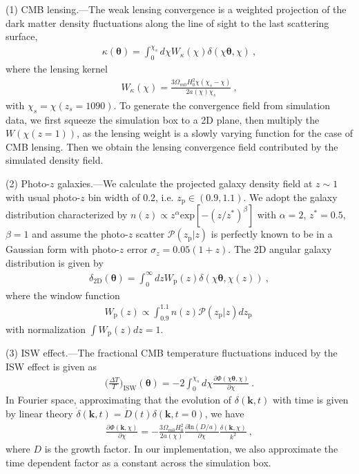 \documentclass[aps,prl,twocolumn,showpacs,superscriptaddress,groupedaddress,nofootinbib,floatfix]{revtex4}  %
\newcommand{\mr}{\mathrm}
\begin{document}
(1) CMB lensing.---The weak lensing convergence is a weighted projection
of the dark matter density fluctuations along the line of sight to the last 
scattering surface,
\begin{eqnarray}
\kappa(\bm{\theta})=\int_0^{\chi_s}d\chi 
W_\kappa(\chi)\delta(\chi\bm{\theta},\chi)\ ,
\end{eqnarray}
where the lensing kernel
\begin{eqnarray}
W_\kappa(\chi)=\frac{3\Omega_{m0}H_0^2\chi(\chi_s-\chi)}{2a(\chi)\chi_s}\ ,
\end{eqnarray}
with $\chi_s=\chi(z_s=1090)$.
To generate the convergence field from simulation data, we first squeeze the 
simulation box to a 2D plane, then multiply the $W(\chi(z=1))$, as the 
lensing weight is a slowly varying function for the case of CMB lensing.
Then we obtain the lensing convergence field contributed by the simulated 
density field.

(2) Photo-$z$ galaxies.---We calculate the projected galaxy density field at 
$z\sim 1$ with usual photo-$z$ bin width of $0.2$, i.e. $z_\mr{p}\in(0.9,1.1)$. 
We adopt the galaxy distribution characterized by 
$n(z)\propto z^{\alpha}\mr{exp}[-(z/z^{*})^\beta]$
with $\alpha=2$, $z^*=0.5$, $\beta=1$
and assume the photo-$z$ scatter $\mathcal{P}(z_\mr{p}|z)$ is perfectly known to be in a Gaussian form with photo-$z$ error $\sigma_z=0.05(1+z)$.
The 2D angular galaxy distribution is given by
\begin{eqnarray}
\delta_\mr{2D}(\bm{\theta})=\int_0^\infty dzW_\mr{p}(z)
\delta(\chi\bm{\theta},\chi(z))\ ,
\end{eqnarray}
where the window function 
\begin{eqnarray}
W_\mr{p}(z)\propto\int_{0.9}^{1.1} n(z) \mathcal{P}(z_\mr{p}|z) dz_\mr{p}\ 
\end{eqnarray}
with normalization $\int W_\mr{p}(z)dz=1$.

(3) ISW effect.---The fractional CMB temperature fluctuations induced by the 
ISW effect is given as 
\begin{eqnarray}
\bigg(\frac{\Delta T}{T}\bigg)_\mr{ISW}(\bm\theta)=-2\int_0^{\chi_s}d\chi
\frac{\partial\Phi(\chi\bm{\theta},\chi)}{\partial\chi}\ .
\end{eqnarray}
In Fourier space, approximating that the evolution of $\delta(\bm{k},t)$ with 
time is given by linear theory
$\dot\delta(\bm{k},t)=\dot D(t)\delta(\bm{k},t=0)$, we have
\begin{eqnarray}
\frac{\partial\Phi(\bm{k},\chi)}{\partial\chi}=-\frac{3\Omega_{m0}H_0^2}
{2a(\chi)}\frac{\partial\mr{ln}(D/a)}{\partial\chi}
\frac{\delta(\bm{k},\chi)}{k^2}\ ,
\end{eqnarray}
where $D$ is the growth factor.
In our implementation, we also approximate the time dependent factor as a 
constant across the simulation box.
\end{document}
